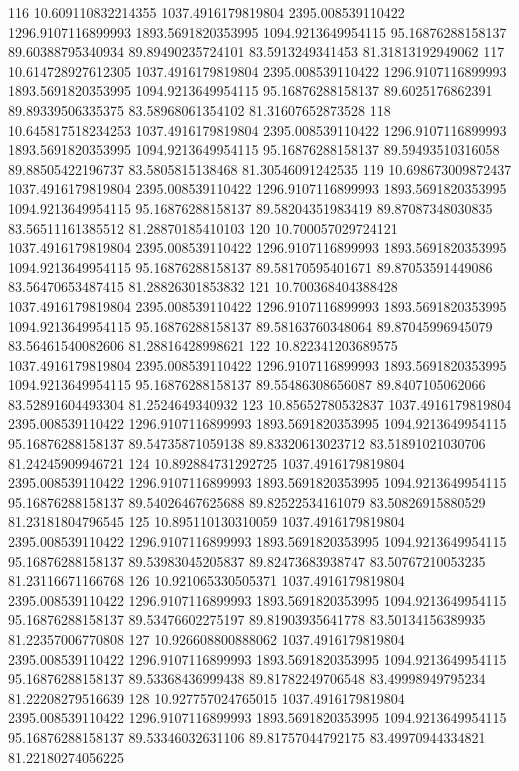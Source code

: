 {116 10.609110832214355 1037.4916179819804 2395.008539110422 1296.9107116899993 1893.5691820353995 1094.9213649954115 95.16876288158137 89.60388795340934 89.89490235724101 83.5913249341453 81.31813192949062
117 10.614728927612305 1037.4916179819804 2395.008539110422 1296.9107116899993 1893.5691820353995 1094.9213649954115 95.16876288158137 89.6025176862391 89.89339506335375 83.58968061354102 81.31607652873528
118 10.645817518234253 1037.4916179819804 2395.008539110422 1296.9107116899993 1893.5691820353995 1094.9213649954115 95.16876288158137 89.59493510316058 89.88505422196737 83.5805815138468 81.30546091242535
119 10.698673009872437 1037.4916179819804 2395.008539110422 1296.9107116899993 1893.5691820353995 1094.9213649954115 95.16876288158137 89.58204351983419 89.87087348030835 83.56511161385512 81.28870185410103
120 10.700057029724121 1037.4916179819804 2395.008539110422 1296.9107116899993 1893.5691820353995 1094.9213649954115 95.16876288158137 89.58170595401671 89.87053591449086 83.56470653487415 81.28826301853832
121 10.700368404388428 1037.4916179819804 2395.008539110422 1296.9107116899993 1893.5691820353995 1094.9213649954115 95.16876288158137 89.58163760348064 89.87045996945079 83.56461540082606 81.28816428998621
122 10.822341203689575 1037.4916179819804 2395.008539110422 1296.9107116899993 1893.5691820353995 1094.9213649954115 95.16876288158137 89.55486308656087 89.8407105062066 83.52891604493304 81.2524649340932
123 10.85652780532837 1037.4916179819804 2395.008539110422 1296.9107116899993 1893.5691820353995 1094.9213649954115 95.16876288158137 89.54735871059138 89.83320613023712 83.51891021030706 81.24245909946721
124 10.892884731292725 1037.4916179819804 2395.008539110422 1296.9107116899993 1893.5691820353995 1094.9213649954115 95.16876288158137 89.54026467625688 89.82522534161079 83.50826915880529 81.23181804796545
125 10.895110130310059 1037.4916179819804 2395.008539110422 1296.9107116899993 1893.5691820353995 1094.9213649954115 95.16876288158137 89.53983045205837 89.82473683938747 83.50767210053235 81.23116671166768
126 10.921065330505371 1037.4916179819804 2395.008539110422 1296.9107116899993 1893.5691820353995 1094.9213649954115 95.16876288158137 89.53476602275197 89.81903935641778 83.50134156389935 81.22357006770808
127 10.926608800888062 1037.4916179819804 2395.008539110422 1296.9107116899993 1893.5691820353995 1094.9213649954115 95.16876288158137 89.53368436999438 89.81782249706548 83.49998949795234 81.22208279516639
128 10.927757024765015 1037.4916179819804 2395.008539110422 1296.9107116899993 1893.5691820353995 1094.9213649954115 95.16876288158137 89.53346032631106 89.81757044792175 83.49970944334821 81.22180274056225
}
